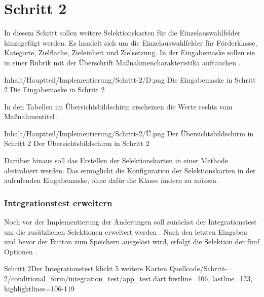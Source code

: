 \chapter{Schritt 2}
\label{chap:Schritt-2}



In diesem Schritt sollen weitere Selektionskarten für die Einzelauswahlfelder hinzugefügt werden.
Es handelt sich um die Einzelauswahlfelder für Förderklasse, Kategorie, Zielfläche, Zieleinheit und Zielsetzung.
In der Eingabemaske sollen sie in einer Rubrik mit der Überschrift  Maßnahmencharakteristika auftauchen \Abb{\ref{fig:Schritt2Eingabemaske}}.

\begin{alexfigure}{Inhalt/Hauptteil/Implementierung/Schritt-2/D.png}
  {Die Eingabemaske in Schritt 2}
  {Die Eingabemaske in Schritt 2}

  \label{fig:Schritt2Eingabemaske}

\end{alexfigure}

In den Tabellen im Übersichtsbildschirm erscheinen  die Werte  rechts  vom Maßnahmentitel \Abb{\ref{fig:Schritt2Uebersicht}}.
\begin{alexfigure}{Inhalt/Hauptteil/Implementierung/Schritt-2/Ü.png}
  {Der Übersichtsbildschirm in Schritt 2}
  {Der Übersichtsbildschirm in Schritt 2}

  \label{fig:Schritt2Uebersicht}

\end{alexfigure}

Darüber hinaus soll das Erstellen der Selektionskarten in einer Methode abstrahiert werden.
Das ermöglicht die Konfiguration der Selektionskarten in der aufrufenden Eingabemaske, ohne dafür die Klasse  ändern zu müssen.

\subsection{Integrationstest erweitern}

Noch vor der Implementierung der Änderungen soll zunächst der Integrationstest um die zusätzlichen Selektionen erweitert werden \Lst{\ref{lst:Schritt2IntegrationstestKlickt5WeitereKarten}}.
Nach den letzten Eingaben und bevor der Button zum Speichern ausgelöst wird, erfolgt die Selektion der fünf Optionen .

\begin{alexlisting}{Schritt 2}{Der Integrationstest klickt 5 weitere Karten}
  {Quellcode/Schritt-2/conditional_form/integration_test/app_test.dart}
  {firstline=106, lastline=123, highlightlines={106-119}}
  \label{lst:Schritt2IntegrationstestKlickt5WeitereKarten}
\end{alexlisting}

